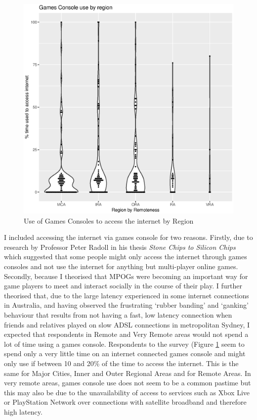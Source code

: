 \begin{figure}
\centering
\includegraphics[scale=0.5]{figures/VChart04-GamesConsoleByRegion.eps} 
\caption{Use of Games Consoles to access the internet by Region}\label{fig:VC04GamesConsoleRegions}
\end{figure}

I included accessing the internet via games console for two reasons. Firstly, due to  research by Professor Peter Radoll in his thesis \textit{Stone Chips to Silicon Chips}\cite{RefWorks:52} which suggested that some people might only access the internet through games consoles and not use the internet for anything but multi-player online games. Secondly, because I theorised that MPOGs were becoming an important way for game players to meet and interact socially in the course of their play. 
I further theorised that, due to the large latency experienced in some internet connections in Australia, and having observed the frustrating `rubber banding' and `ganking' behaviour that results from not having a fast, low latency connection when friends and relatives played on slow ADSL connections in metropolitan Sydney, I expected that respondents in Remote and Very Remote areas would not spend a lot of time using a games console. Respondents to the survey (Figure \ref{fig:VC04GamesConsoleRegions} seem to spend only a very little time on an internet connected games console and might only use if between 10 and 20\% of the time to access the internet. This is the same for Major Cities, Inner and Outer Regional Areas and for Remote Areas. In very remote areas, games console use does not seem to be a common pastime but this may also be due to the unavailability of access to services such as Xbox Live or PlayStation Network over connections with satellite broadband and therefore high latency.

